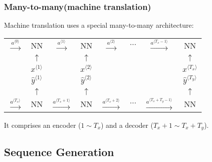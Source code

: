 \subsubsection{Many-to-many(machine translation)}
Machine translation uses a special many-to-many architecture:
\begin{center}
  \begin{tabular}{cccccccc}
    $\xrightarrow{a^{\langle 0\rangle}}$& NN & $\xrightarrow{a^{\langle 1\rangle}}$ & NN & $\xrightarrow{a^{\langle 2\rangle}}$ & $\cdots$ & $\xrightarrow{a^{\langle T_x-1\rangle}}$ & NN \\ 
    & $\uparrow$ & & $\uparrow$ & & & & $\uparrow$ \\
    & $x^{\langle 1\rangle}$ & & $x^{\langle 2\rangle}$ & & & & $x^{\langle T_x\rangle}$ \\\arrayrulecolor{red}\hline
    & $\hat{y}^{\langle 1\rangle}$ & & $\hat{y}^{\langle 2\rangle}$ & & & & $\hat{y}^{\langle T_y\rangle}$\\
    & $\uparrow$ & & $\uparrow$ & & & & $\uparrow$\\
    $\xrightarrow{a^{\langle T_x\rangle}}$ & NN & $\xrightarrow{a^{\langle T_x+1\rangle}}$ & NN & $\xrightarrow{a^{\langle T_x+2\rangle}}$ &  $\cdots$ & $\xrightarrow{a^{\langle T_x+T_y-1\rangle}}$ & NN \\
  \end{tabular}
\end{center}
It comprises an encoder ($1\sim T_x$) and a decoder ($T_x+1\sim T_x+T_y$).
\subsection{Sequence Generation}
\ifx\PREAMBLE\undefined

\fi